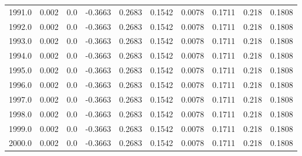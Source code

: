 \begin{longtable}{lrrrrrrrrr}
1991.0 & 0.002 & 0.0 & -0.3663 & 0.2683 & 0.1542 & 0.0078 & 0.1711 & 0.218 & 0.1808 \\
1992.0 & 0.002 & 0.0 & -0.3663 & 0.2683 & 0.1542 & 0.0078 & 0.1711 & 0.218 & 0.1808 \\
1993.0 & 0.002 & 0.0 & -0.3663 & 0.2683 & 0.1542 & 0.0078 & 0.1711 & 0.218 & 0.1808 \\
1994.0 & 0.002 & 0.0 & -0.3663 & 0.2683 & 0.1542 & 0.0078 & 0.1711 & 0.218 & 0.1808 \\
1995.0 & 0.002 & 0.0 & -0.3663 & 0.2683 & 0.1542 & 0.0078 & 0.1711 & 0.218 & 0.1808 \\
1996.0 & 0.002 & 0.0 & -0.3663 & 0.2683 & 0.1542 & 0.0078 & 0.1711 & 0.218 & 0.1808 \\
1997.0 & 0.002 & 0.0 & -0.3663 & 0.2683 & 0.1542 & 0.0078 & 0.1711 & 0.218 & 0.1808 \\
1998.0 & 0.002 & 0.0 & -0.3663 & 0.2683 & 0.1542 & 0.0078 & 0.1711 & 0.218 & 0.1808 \\
1999.0 & 0.002 & 0.0 & -0.3663 & 0.2683 & 0.1542 & 0.0078 & 0.1711 & 0.218 & 0.1808 \\
2000.0 & 0.002 & 0.0 & -0.3663 & 0.2683 & 0.1542 & 0.0078 & 0.1711 & 0.218 & 0.1808 \\
\end{longtable}